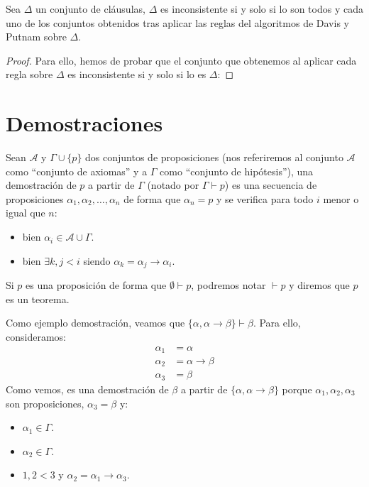 \begin{prop}
    Sea $\Delta$ un conjunto de cláusulas, $\Delta$ es inconsistente si y solo si lo son todos y cada uno de los conjuntos obtenidos tras aplicar las reglas del algoritmos de Davis y Putnam sobre $\Delta$.
    \begin{proof}
        Para ello, hemos de probar que el conjunto que obtenemos al aplicar cada regla sobre $\Delta$ es inconsistente si y solo si lo es $\Delta$:
    \end{proof}
\end{prop}

\section{Demostraciones}
\begin{definicion}[Demostración]
    Sean $\mathcal{A}$ y $\Gamma\cup\{p\}$ dos conjuntos de proposiciones (nos referiremos al conjunto $\mathcal{A}$ como ``conjunto de axiomas'' y a $\Gamma$ como ``conjunto de hipótesis''), una demostración de $p$ a partir de $\Gamma$ (notado por $\Gamma\vdash p$) es una secuencia de proposiciones $\alpha_1,\alpha_2,\ldots,\alpha_n$ de forma que $\alpha_n=p$ y se verifica para todo $i$ menor o igual que $n$:
    \begin{itemize}
        \item bien $\alpha_i \in \mathcal{A}\cup\Gamma$.
        \item bien $\exists k,j<i$ siendo $\alpha_k = \alpha_j\to \alpha_i$.
    \end{itemize}
\end{definicion}

\begin{notacion}
    Si $p$ es una proposición de forma que $\emptyset \vdash p$, podremos notar $\vdash p$ y diremos que $p$ es un teorema.
\end{notacion}

\begin{ejemplo}
    Como ejemplo demostración, veamos que $\{\alpha,\alpha\to\beta\}\vdash \beta$. Para ello, consideramos:
    \begin{align*}
        \alpha_1 &= \alpha \\
        \alpha_2 &= \alpha\to\beta \\
        \alpha_3 &= \beta
    \end{align*}
    Como vemos, es una demostración de $\beta$ a partir de $\{\alpha,\alpha\to\beta\}$ porque $\alpha_1,\alpha_2,\alpha_3$ son proposiciones, $\alpha_3=\beta$ y:
    \begin{itemize}
        \item $\alpha_1\in \Gamma$.
        \item $\alpha_2\in \Gamma$.
        \item $1,2<3$ y $\alpha_2 = \alpha_1\to \alpha_3$.
    \end{itemize}
\end{ejemplo}

